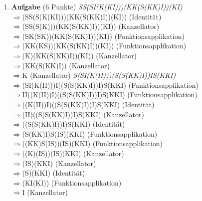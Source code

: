 \documentclass[11pt]{article}
\newcommand{\punkte}[1]{{\small{ }(#1 Punkte)}}
\newcommand{\aufgabe}[1]{\item{\bf #1}}
\begin{document}
\begin{enumerate}
\aufgabe{Aufgabe}\punkte{6}
\textit{SS(SI(K(KI)))(KK(S(KK)I))(KI)}\\
$\Rightarrow$(SS(S(K(KI)))(KK(S(KK)I))(KI))             \hfill (Identität)\\
$\Rightarrow$(SS(S(K)))(KK(S(KK)I))(KI))                 \hfill (Kanzellator)\\
$\Rightarrow$(SK(SK))(KK(S(KK)I))(KI))                   \hfill (Funktionsapplikation)\\
$\Rightarrow$(KK(KS))(KK(S(KK)I))(KI))                   \hfill (Funktionsapplikation)\\
$\Rightarrow$(K)(KK(S(KK)I))(KI))                        \hfill (Kanzellator)\\
$\Rightarrow$(KK(S(KK)I))                                \hfill (Kanzellator)\\
$\Rightarrow$K                                           \hfill (Kanzellator) 
\newline
\newline
\textit{S(SI(K(II)))(S(S(KK)I))IS(KKI)}\\
$\Rightarrow$(SI(K(II)))I((S(S(KK)I))I)S(KKI)            \hfill (Funktionsapplikation)\\
$\Rightarrow$II((K(II))I)((S(S(KK)I))I)S(KKI)             \hfill (Funktionsapplikation)\\
$\Rightarrow$((K(II))I)((S(S(KK)I))I)S(KKI)              \hfill (Identität)\\
$\Rightarrow$(II)((S(S(KK)I))I)S(KKI)                     \hfill (Kanzellator)\\
$\Rightarrow$((S(S(KK)I))I)S(KKI)                        \hfill (Identität)\\
$\Rightarrow$(S(KK)I)S(IS)(KKI)                          \hfill (Funktionsapplikation)\\
$\Rightarrow$((KK)S(IS))(IS)(KKI)                        \hfill (Funktionsapplikation)\\
$\Rightarrow$((K)(IS))(IS)(KKI)                          \hfill (Kanzellator)\\
$\Rightarrow$(IS)(KKI)                                   \hfill (Kanzellator)\\
$\Rightarrow$(S)(KKI)                                    \hfill (Identität)\\
$\Rightarrow$(KI(KI))                                    \hfill (Funktionsapplikation)\\
$\Rightarrow$I                                           \hfill (Kanzellator)\\


\end{enumerate}
\end{document}
